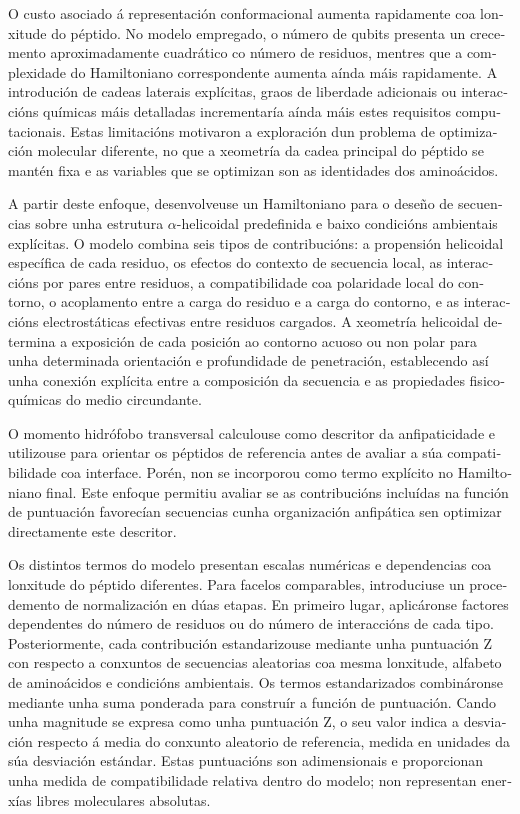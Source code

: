 \begin{otherlanguage}{galician}
O custo asociado á representación conformacional aumenta rapidamente coa lonxitude do péptido. No modelo empregado, o número de qubits presenta un crecemento aproximadamente cuadrático co número de residuos, mentres que a complexidade do Hamiltoniano correspondente aumenta aínda máis rapidamente. A introdución de cadeas laterais explícitas, graos de liberdade adicionais ou interaccións químicas máis detalladas incrementaría aínda máis estes requisitos computacionais. Estas limitacións motivaron a exploración dun problema de optimización molecular diferente, no que a xeometría da cadea principal do péptido se mantén fixa e as variables que se optimizan son as identidades dos aminoácidos.

A partir deste enfoque, desenvolveuse un Hamiltoniano para o deseño de secuencias sobre unha estrutura $\alpha$-helicoidal predefinida e baixo condicións ambientais explícitas. O modelo combina seis tipos de contribucións: a propensión helicoidal específica de cada residuo, os efectos do contexto de secuencia local, as interaccións por pares entre residuos, a compatibilidade coa polaridade local do contorno, o acoplamento entre a carga do residuo e a carga do contorno, e as interaccións electrostáticas efectivas entre residuos cargados. A xeometría helicoidal determina a exposición de cada posición ao contorno acuoso ou non polar para unha determinada orientación e profundidade de penetración, establecendo así unha conexión explícita entre a composición da secuencia e as propiedades fisicoquímicas do medio circundante.

O momento hidrófobo transversal calculouse como descritor da anfipaticidade e utilizouse para orientar os péptidos de referencia antes de avaliar a súa compatibilidade coa interface. Porén, non se incorporou como termo explícito no Hamiltoniano final. Este enfoque permitiu avaliar se as contribucións incluídas na función de puntuación favorecían secuencias cunha organización anfipática sen optimizar directamente este descritor.

Os distintos termos do modelo presentan escalas numéricas e dependencias coa lonxitude do péptido diferentes. Para facelos comparables, introduciuse un procedemento de normalización en dúas etapas. En primeiro lugar, aplicáronse factores dependentes do número de residuos ou do número de interaccións de cada tipo. Posteriormente, cada contribución estandarizouse mediante unha puntuación Z con respecto a conxuntos de secuencias aleatorias coa mesma lonxitude, alfabeto de aminoácidos e condicións ambientais. Os termos estandarizados combináronse mediante unha suma ponderada para construír a función de puntuación. Cando unha magnitude se expresa como unha puntuación Z, o seu valor indica a desviación respecto á media do conxunto aleatorio de referencia, medida en unidades da súa desviación estándar. Estas puntuacións son adimensionais e proporcionan unha medida de compatibilidade relativa dentro do modelo; non representan enerxías libres moleculares absolutas.


\end{otherlanguage}
